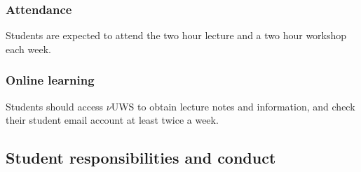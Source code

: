 \documentclass{uws_learning_guide}
\newcommand{\vuws}{$\nu$UWS}
\begin{document}
\subsubsection{Attendance}
Students are expected to attend the two hour lecture and a two
hour workshop each week.

\subsubsection{Online learning}
Students should access \vuws{} to obtain lecture notes and information,
and check their student email account at least twice a week.



\subsection{\warninglogo{} Student responsibilities and conduct}
\end{document}
